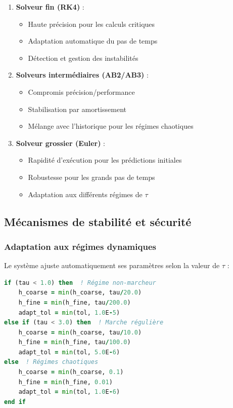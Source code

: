 \begin{enumerate}
    \item \textbf{Solveur fin (RK4)} :
    \begin{itemize}
        \item Haute précision pour les calculs critiques
        \item Adaptation automatique du pas de temps
        \item Détection et gestion des instabilités
    \end{itemize}

    \item \textbf{Solveurs intermédiaires (AB2/AB3)} :
    \begin{itemize}
        \item Compromis précision/performance
        \item Stabilisation par amortissement
        \item Mélange avec l'historique pour les régimes chaotiques
    \end{itemize}

    \item \textbf{Solveur grossier (Euler)} :
    \begin{itemize}
        \item Rapidité d'exécution pour les prédictions initiales
        \item Robustesse pour les grands pas de temps
        \item Adaptation aux différents régimes de $\tau$
    \end{itemize}
\end{enumerate}

\subsection{Mécanismes de stabilité et sécurité}

\subsubsection{Adaptation aux régimes dynamiques}
Le système ajuste automatiquement ses paramètres selon la valeur de $\tau$ :

\begin{lstlisting}[language=Fortran,caption=Adaptation dynamique des paramètres]
if (tau < 1.0) then  ! Régime non-marcheur
    h_coarse = min(h_coarse, tau/20.0)
    h_fine = min(h_fine, tau/200.0)
    adapt_tol = min(tol, 1.0E-5)
else if (tau < 3.0) then  ! Marche régulière
    h_coarse = min(h_coarse, tau/10.0)
    h_fine = min(h_fine, tau/100.0)
    adapt_tol = min(tol, 5.0E-6)
else  ! Régimes chaotiques
    h_coarse = min(h_coarse, 0.1)
    h_fine = min(h_fine, 0.01)
    adapt_tol = min(tol, 1.0E-6)
end if
\end{lstlisting}

